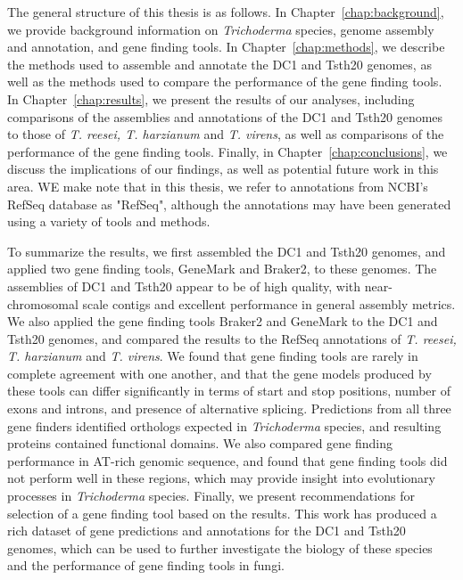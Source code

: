 The general structure of this thesis is as follows. In Chapter~\ref{chap:background}, we provide background information on \textit{Trichoderma} species, genome assembly and annotation, and gene finding tools. In Chapter~\ref{chap:methods}, we describe the methods used to assemble and annotate the DC1 and Tsth20 genomes, as well as the methods used to compare the performance of the gene finding tools. In Chapter~\ref{chap:results}, we present the results of our analyses, including comparisons of the assemblies and annotations of the DC1 and Tsth20 genomes to those of \textit{T. reesei, T. harzianum} and \textit{T. virens}, as well as comparisons of the performance of the gene finding tools. Finally, in Chapter~\ref{chap:conclusions}, we discuss the implications of our findings, as well as potential future work in this area. WE make note that in this thesis, we refer to annotations from NCBI's RefSeq database as "RefSeq", although the annotations may have been generated using a variety of tools and methods. 

  To summarize the results, we first assembled the DC1 and Tsth20 genomes, and applied two gene finding tools, GeneMark and Braker2, to these genomes. The assemblies of DC1 and Tsth20 appear to be of high quality, with near-chromosomal scale contigs and excellent performance in general assembly metrics. We also applied the gene finding tools Braker2 and GeneMark to the DC1 and Tsth20 genomes, and compared the results to the RefSeq annotations of \textit{T. reesei, T. harzianum} and \textit{T. virens}. We found that gene finding tools are rarely in complete agreement with one another, and that the gene models produced by these tools can differ significantly in terms of start and stop positions, number of exons and introns, and presence of alternative splicing. Predictions from all three gene finders identified orthologs expected in \textit{Trichoderma} species, and resulting proteins contained functional domains. We also compared gene finding performance in AT-rich genomic sequence, and found that gene finding tools did not perform well in these regions, which may provide insight into evolutionary processes in \textit{Trichoderma} species. Finally, we present recommendations for selection of a gene finding tool based on the results. This work has produced a rich dataset of gene predictions and annotations for the DC1 and Tsth20 genomes, which can be used to further investigate the biology of these species and the performance of gene finding tools in fungi.